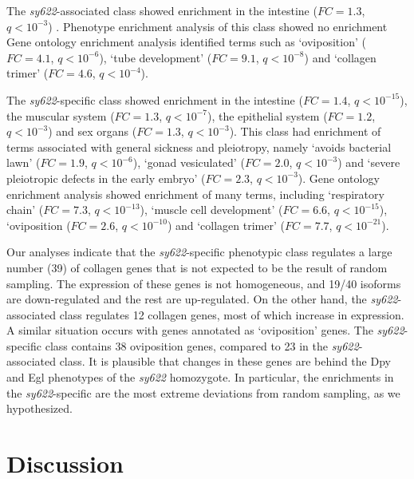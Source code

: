 \documentclass[10pt, twocolumn]{article}
\newcommand{\qval}[1]{$q<10^{-#1}$}
\begin{document}
The \emph{sy622}-associated class showed enrichment in the intestine ($FC=1.3$,
\qval{3})
. Phenotype enrichment analysis of this class
showed
no enrichment
Gene ontology enrichment analysis identified terms such as
`oviposition' ($FC=4.1$, \qval{6}), `tube development' ($FC=9.1$, \qval{8}) and
`collagen trimer' ($FC=4.6$, \qval{4}).

The \emph{sy622}-specific class showed enrichment in the intestine ($FC=1.4$,
\qval{15}), the muscular system ($FC=1.3$, \qval{7}), the epithelial system
($FC=1.2$, \qval{3}) and sex organs ($FC=1.3$, \qval{3}). This class had
enrichment of terms associated with general sickness and pleiotropy, namely
`avoids bacterial lawn' ($FC=1.9$, \qval{6}), `gonad vesiculated' ($FC=2.0$,
\qval{3}) and `severe pleiotropic defects in the early embryo' ($FC=2.3$,
\qval{3}). Gene ontology enrichment analysis showed enrichment of many terms,
including `respiratory chain' ($FC=7.3$, \qval{13}), `muscle cell development'
($FC=6.6$, \qval{15}),  `oviposition ($FC=2.6$, \qval{10}) and `collagen trimer'
($FC=7.7$, \qval{21}).

Our analyses indicate that the \emph{sy622}-specific phenotypic class
regulates a large number (39) of collagen genes that is not expected to be the
result of random sampling. The expression of these genes is not homogeneous,
and 19/40 isoforms are down-regulated and the rest are up-regulated. On the
other hand, the \emph{sy622}-associated class regulates 12 collagen genes, most
of which increase in expression. A similar situation occurs with genes annotated
as `oviposition' genes. The \emph{sy622}-specific class contains 38 oviposition
genes, compared to 23 in the \emph{sy622}-associated class. It is plausible that
changes in these genes are behind the Dpy and Egl phenotypes of the \emph{sy622}
homozygote. In particular, the enrichments in the \emph{sy622}-specific are the
most extreme deviations from random sampling, as we hypothesized.

\section*{Discussion}
\label{sec:conclusions}
\end{document}
